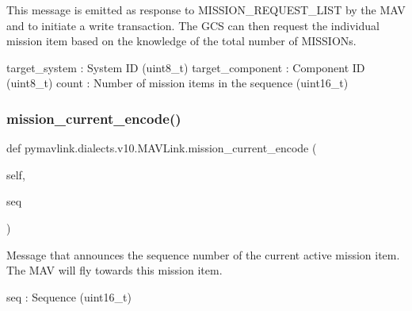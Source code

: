 \begin{DoxyVerb}
\begin{DoxyVerb}
\begin{DoxyVerb}
\begin{DoxyVerb}
\begin{DoxyVerb}This message is emitted as response to MISSION_REQUEST_LIST by the MAV
and to initiate a write transaction. The GCS can then
request the individual mission item based on the
knowledge of the total number of MISSIONs.

target_system             : System ID (uint8_t)
target_component          : Component ID (uint8_t)
count                     : Number of mission items in the sequence (uint16_t)\end{DoxyVerb}
 \mbox{\label{classpymavlink_1_1dialects_1_1v10_1_1MAVLink_a15c4a5182806371bf3946a68fe95b149}} 
\subsubsection{\texorpdfstring{mission\+\_\+current\+\_\+encode()}{mission\_current\_encode()}}
{\footnotesize\ttfamily def pymavlink.\+dialects.\+v10.\+M\+A\+V\+Link.\+mission\+\_\+current\+\_\+encode (\begin{DoxyParamCaption}\item[{}]{self,  }\item[{}]{seq }\end{DoxyParamCaption})}

\begin{DoxyVerb}Message that announces the sequence number of the current active
mission item. The MAV will fly towards this mission
item.

seq                       : Sequence (uint16_t)\end{DoxyVerb}
 \mbox{\label{classpymavlink_1_1dialects_1_1v10_1_1MAVLink_a2bcfb35e1e3120b29eab5e1f7aedf674}} 

\end{DoxyVerb}
\end{DoxyVerb}
\end{DoxyVerb}
\end{DoxyVerb}
